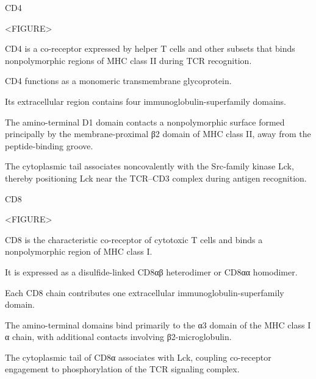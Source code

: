       \begin{core}{CD4}

        <FIGURE>

        CD4 is a co-receptor expressed by helper T cells and other subsets that binds nonpolymorphic regions of MHC class II during TCR recognition.

        CD4 functions as a monomeric transmembrane glycoprotein.

        Its extracellular region contains four immunoglobulin-superfamily domains.

        The amino-terminal D1 domain contacts a nonpolymorphic surface formed principally by the membrane-proximal β2 domain of MHC class II, away from the peptide-binding groove.

        The cytoplasmic tail associates noncovalently with the Src-family kinase Lck, thereby positioning Lck near the TCR--CD3 complex during antigen recognition.

      \end{core}

      \begin{core}{CD8}

        <FIGURE>

        CD8 is the characteristic co-receptor of cytotoxic T cells and binds a nonpolymorphic region of MHC class I.

        It is expressed as a disulfide-linked CD8αβ heterodimer or CD8αα homodimer.

        Each CD8 chain contributes one extracellular immunoglobulin-superfamily domain.

        The amino-terminal domains bind primarily to the α3 domain of the MHC class I α chain, with additional contacts involving β2-microglobulin.

        The cytoplasmic tail of CD8α associates with Lck, coupling co-receptor engagement to phosphorylation of the TCR signaling complex.

      \end{core}

